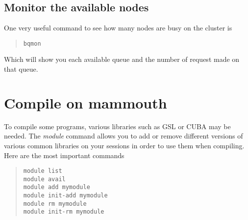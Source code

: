 \documentclass[10pt,letter]{article}
\begin{document}
\subsection{Monitor the available nodes}
One very useful command to see how many nodes are busy on the cluster is 
\begin{quote}
\begin{verbatim}
bqmon
\end{verbatim}
\end{quote}
Which will show you each available queue and the number of request made on that queue.

\section{Compile on mammouth}

To compile some programs, various libraries such as GSL or CUBA may be needed. The \emph{module} command allows you to  add or remove different versions of various common libraries on your sessions in order to use them when compiling. Here are the most important commands
\begin{quote}
\begin{verbatim}
module list
module avail
module add mymodule
module init-add mymodule
module rm mymodule
module init-rm mymodule
\end{verbatim}
\end{quote}
\end{document}
